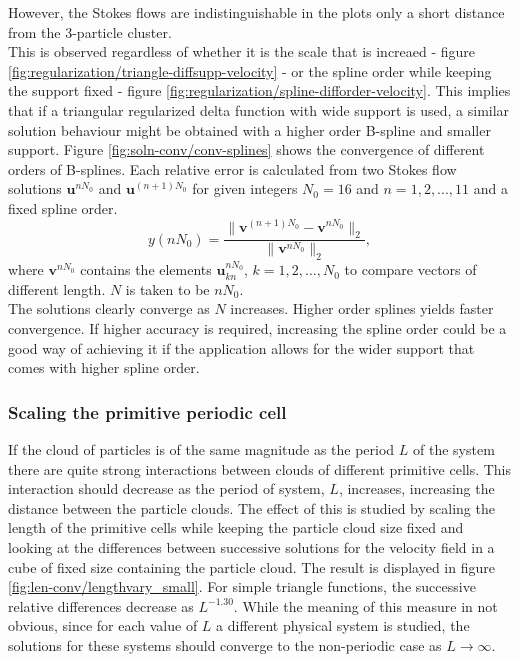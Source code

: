 \documentclass[a4paper,
twoside=false,abstract=false,numbers=noenddot,
titlepage=false,headings=small,parskip=half,version=last]{scrartcl}
\begin{document}
However, the Stokes flows are indistinguishable in the plots only a short distance from the 3-particle cluster.\\
This is observed regardless of whether it is the scale that is increaed - figure \ref{fig:regularization/triangle-diffsupp-velocity} - or the spline order while keeping the support fixed - figure \ref{fig:regularization/spline-difforder-velocity}. This implies that if a triangular regularized delta function with wide support is used, a similar solution behaviour might be obtained with a higher order B-spline and smaller support.
Figure \ref{fig:soln-conv/conv-splines} shows the convergence of different orders of B-splines.
Each relative error is calculated from two Stokes flow solutions $\mathbf{u}^{nN_0}$ and $\mathbf{u}^{(n+1)N_0}$ for given integers $N_0=16$ and $n=1,2,...,11$ and a fixed spline order.
\begin{equation}
y(nN_0) = \frac{\|\mathbf{v}^{(n+1)N_0}-\mathbf{v}^{nN_0}\|_2}{\|\mathbf{v}^{nN_0}\|_2},
\end{equation}
where $\mathbf{v}^{nN_0}$ contains the elements $\mathbf{u}^{nN_0}_{kn}$, $k=1,2,...,N_0$ to compare vectors of different length. $N$ is taken to be $nN_0$.\\
The solutions clearly converge as $N$ increases.
Higher order splines yields faster convergence.
If higher accuracy is required, increasing the spline order could be a good way of achieving it if the application allows for the wider support that comes with higher spline order.
\subsubsection{Scaling the primitive periodic cell}\label{cellscale}
If the cloud of particles is of the same magnitude as the period $L$ of the system there are quite strong interactions between clouds of different primitive cells.
This interaction should decrease as the period of system, $L$, increases, increasing the distance between the particle clouds.
The effect of this is studied by scaling the length of the primitive cells while keeping the particle cloud size fixed and looking at the differences between successive solutions for the velocity field in a cube of fixed size containing the particle cloud.
The result is displayed in figure \ref{fig:len-conv/lengthvary_small}.
For simple triangle functions, the successive relative differences decrease as $L^{-1.30}$.
While the meaning of this measure in not obvious, since for each value of $L$ a different physical system is studied, the solutions for these systems should converge to the non-periodic case as $L\rightarrow \infty$.
\end{document}
